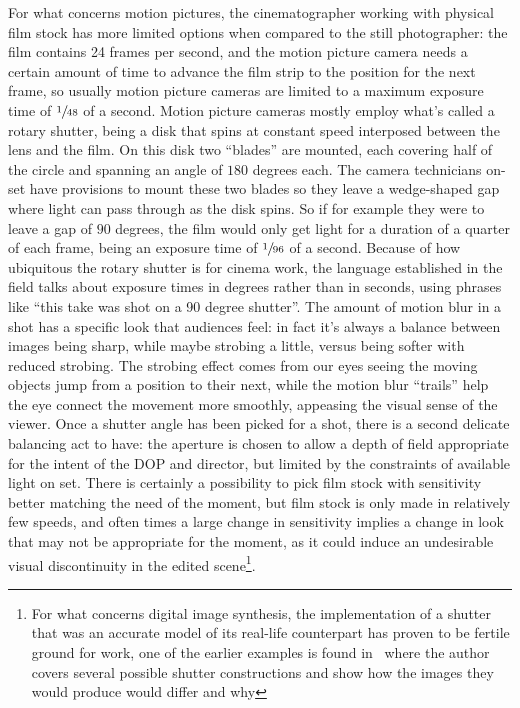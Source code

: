 For what concerns motion pictures, the cinematographer working with physical film stock has more limited 
options when compared to the still photographer: the film contains 24 frames per second, and the motion
picture camera needs a certain amount of time to advance the film strip to the position for the next frame,
so usually motion picture cameras are limited to a maximum exposure time of $\sfrac1{48}$ of a second.
Motion picture cameras mostly employ what's called a \gls{rotary shutter}, being a disk that spins 
at constant speed interposed between the lens and the film. 
On this disk two ``blades'' are mounted, each covering half of the circle and spanning an angle of $180$ degrees each. 
The camera technicians on-set have provisions to mount these two blades so they leave a 
wedge-shaped gap where light can pass through as the disk spins.
So if for example they were to leave a gap of $90$ degrees, the film would only get light for a 
duration of a quarter of each frame, being an exposure time of $\sfrac1{96}$ of a second.
Because of how ubiquitous the \gls{rotary shutter} is for cinema work, the language established in the field
talks about exposure times in degrees rather than in seconds, using phrases like 
``this take was shot on a 90 degree shutter''.
The amount of motion blur in a shot has a specific look that audiences feel: in fact it's 
always a balance between images being sharp, while maybe \gls{strobing} a little, versus being 
softer with reduced \gls{strobing}. The strobing effect comes from our eyes seeing the moving objects
jump from a position to their next, while the motion blur ``trails'' help the eye connect the 
movement more smoothly, appeasing the visual sense of the viewer.
Once a \gls{shutter} angle has been picked for a shot, there is a second delicate balancing act
to have: the \gls{aperture} is chosen to allow a depth of field appropriate for the intent
of the \gls{DOP} and director, but limited by the constraints of available light on set.
There is certainly a possibility to pick film stock with sensitivity better matching the need
of the moment, but film stock is only made in relatively few speeds, and often times a large change
in sensitivity implies a change in look that may not be appropriate for the moment, as it could
induce an undesirable visual discontinuity in the edited scene\footnote{For what concerns digital image synthesis, 
	the implementation of a shutter that was an accurate 
	model of its real-life counterpart has proven to be fertile ground for work, one of the earlier
	examples is found in~\cite{glassner99} where the author covers several possible shutter constructions
	and show how the images they would produce would differ and why}. 
